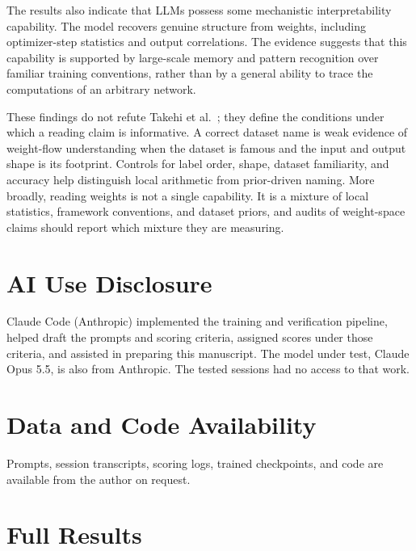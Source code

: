 \documentclass[11pt]{article}
\begin{document}
The results also indicate that LLMs possess some mechanistic interpretability capability. The model recovers genuine structure from weights, including optimizer-step statistics and output correlations. The evidence suggests that this capability is supported by large-scale memory and pattern recognition over familiar training conventions, rather than by a general ability to trace the computations of an arbitrary network.

These findings do not refute Takehi et al.~\cite{takehi}; they define the conditions under which a reading claim is informative. A correct dataset name is weak evidence of weight-flow understanding when the dataset is famous and the input and output shape is its footprint. Controls for label order, shape, dataset familiarity, and accuracy help distinguish local arithmetic from prior-driven naming. More broadly, reading weights is not a single capability. It is a mixture of local statistics, framework conventions, and dataset priors, and audits of weight-space claims should report which mixture they are measuring.

\section*{AI Use Disclosure}

Claude Code (Anthropic) implemented the training and verification pipeline, helped draft the prompts and scoring criteria, assigned scores under those criteria, and assisted in preparing this manuscript. The model under test, Claude Opus 5.5, is also from Anthropic. The tested sessions had no access to that work.

\section*{Data and Code Availability}

Prompts, session transcripts, scoring logs, trained checkpoints, and code are available from the author on request.

\clearpage
\appendix

\section{Full Results}
\label{app:results}
\end{document}
